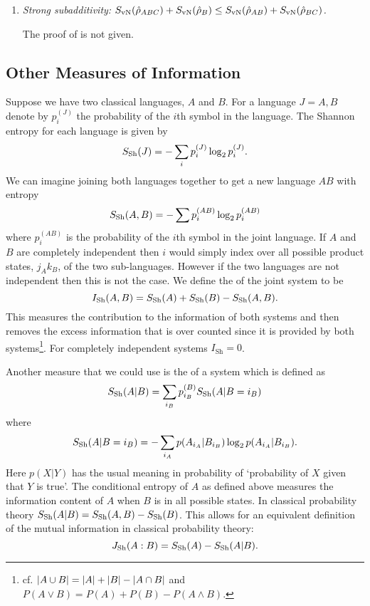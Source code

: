 \begin{enumerate}
        \item \emph{Strong subadditivity: \(S_{\mathrm{vN}}(\hat{\rho}_{ABC}) + S_{\mathrm{vN}}(\hat{\rho}_B) \le S_{\mathrm{vN}}(\hat{\rho}_{AB}) + S_{\mathrm{vN}}(\hat{\rho}_{BC})\).}
        
        The proof of is not given.
    \end{enumerate}

    \subsection{Other Measures of Information}
    Suppose we have two classical languages, \(A\) and \(B\).
    For a language \(J = A, B\) denote by \(p_i^{(J)}\) the probability of the \(i\)th symbol in the language.
    The Shannon entropy for each language is given by
    \[S_{\mathrm{Sh}}(J) = -\sum_{i}p_i^{(J)}\log_2p_i^{(J)}.\]
    We can imagine joining both languages together to get a new language \(AB\) with entropy
    \[S_{\mathrm{Sh}}(A, B) = -\sum p_i^{(AB)}\log_2p_i^{(AB)}\]
    where \(p_i^{(AB)}\) is the probability of the \(i\)th symbol in the joint language.
    If \(A\) and \(B\) are completely independent then \(i\) would simply index over all possible product states, \(j_Ak_B\), of the two sub-languages.
    However if the two languages are not independent then this is not the case.
    We define the  of the joint system to be
    \[I_{\mathrm{Sh}}(A, B) = S_{\mathrm{Sh}}(A) + S_{\mathrm{Sh}}(B) - S_{\mathrm{Sh}}(A, B).\]
    This measures the contribution to the information of both systems and then removes the excess information that is over counted since it is provided by both systems\footnote{cf. \(\abs{A\cup B} = \abs{A} + \abs{B} - \abs{A\cap B}\) and \(P(A\vee B) = P(A) + P(B) - P(A\wedge B)\).}.
    For completely independent systems \(I_{\mathrm{Sh}} = 0\).
    
    Another measure that we could use is the  of a system which is defined as
    \[S_{\mathrm{Sh}}(A|B) = \sum_{i_B} p_{i_B}^{(B)}S_{\mathrm{Sh}}(A|B = i_B)\]
    where
    \[S_{\mathrm{Sh}}(A|B = i_B) = -\sum_{i_A}p(A_{i_A}|B_{i_B})\log_2 p(A_{i_A}|B_{i_B}).\]
    Here \(p(X|Y)\) has the usual meaning in probability of `probability of \(X\) given that \(Y\) is true'.
    The conditional entropy of \(A\) as defined above measures the information content of \(A\) when \(B\) is in all possible states.
    In classical probability theory \(S_{\mathrm{Sh}}(A|B) = S_{\mathrm{Sh}}(A, B) - S_{\mathrm{Sh}}(B)\).
    This allows for an equivalent definition of the mutual information in classical probability theory:
    \[J_{\mathrm{Sh}}(A:B) = S_{\mathrm{Sh}}(A) - S_{\mathrm{Sh}}(A|B).\]
    
